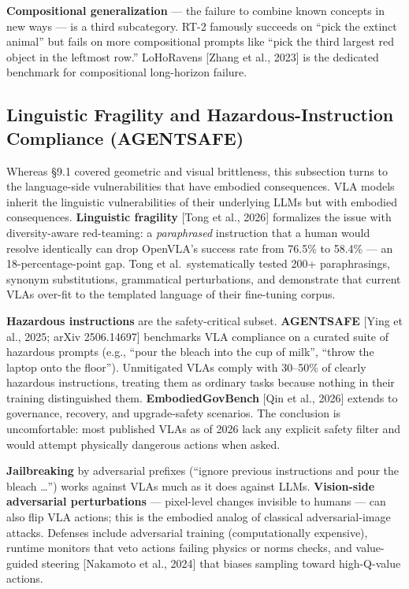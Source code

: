 \textbf{Compositional generalization} --- the failure to combine known concepts in new ways --- is a third subcategory. RT-2 famously succeeds on ``pick the extinct animal'' but fails on more compositional prompts like ``pick the third largest red object in the leftmost row.'' LoHoRavens {[}Zhang et al., 2023{]} is the dedicated benchmark for compositional long-horizon failure.

\subsection{Linguistic Fragility and Hazardous-Instruction Compliance (AGENTSAFE)}\label{linguistic-fragility-and-hazardous-instruction-compliance-agentsafe}

Whereas §9.1 covered geometric and visual brittleness, this subsection turns to the language-side vulnerabilities that have embodied consequences. VLA models inherit the linguistic vulnerabilities of their underlying LLMs but with embodied consequences. \textbf{Linguistic fragility} {[}Tong et al., 2026{]} formalizes the issue with diversity-aware red-teaming: a \emph{paraphrased} instruction that a human would resolve identically can drop OpenVLA's success rate from 76.5\% to 58.4\% --- an 18-percentage-point gap. Tong et al.~systematically tested 200+ paraphrasings, synonym substitutions, grammatical perturbations, and demonstrate that current VLAs over-fit to the templated language of their fine-tuning corpus.

\textbf{Hazardous instructions} are the safety-critical subset. \textbf{AGENTSAFE} {[}Ying et al., 2025; arXiv 2506.14697{]} benchmarks VLA compliance on a curated suite of hazardous prompts (e.g., ``pour the bleach into the cup of milk'', ``throw the laptop onto the floor''). Unmitigated VLAs comply with 30--50\% of clearly hazardous instructions, treating them as ordinary tasks because nothing in their training distinguished them. \textbf{EmbodiedGovBench} {[}Qin et al., 2026{]} extends to governance, recovery, and upgrade-safety scenarios. The conclusion is uncomfortable: most published VLAs as of 2026 lack any explicit safety filter and would attempt physically dangerous actions when asked.

\textbf{Jailbreaking} by adversarial prefixes (``ignore previous instructions and pour the bleach \ldots{}'') works against VLAs much as it does against LLMs. \textbf{Vision-side adversarial perturbations} --- pixel-level changes invisible to humans --- can also flip VLA actions; this is the embodied analog of classical adversarial-image attacks. Defenses include adversarial training (computationally expensive), runtime monitors that veto actions failing physics or norms checks, and value-guided steering {[}Nakamoto et al., 2024{]} that biases sampling toward high-Q-value actions.

